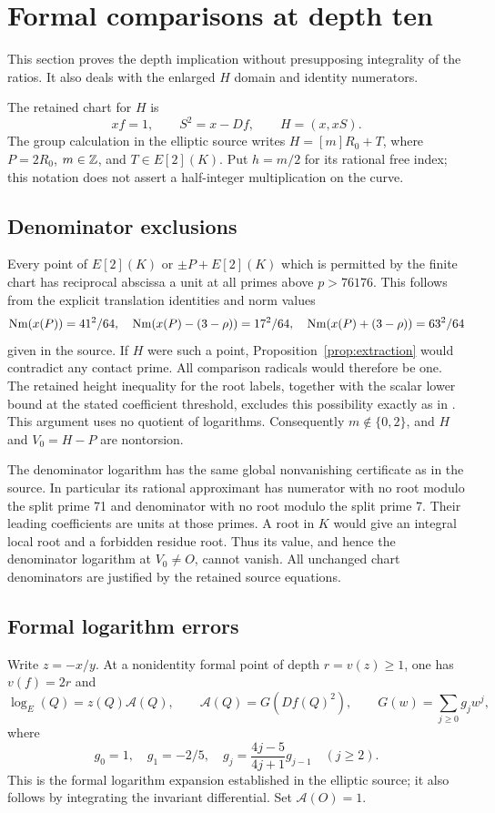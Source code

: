 \documentclass[11pt,a4paper]{article}
\theoremstyle{remark}\newtheorem{remark}[theorem]{Remark}
\begin{document}
\section{Formal comparisons at depth ten}\label{sec:formal}
This section proves the depth implication without presupposing
integrality of the ratios. It also deals with the enlarged $H$ domain
and identity numerators.

The retained chart for $H$ is
\[
 xf=1,\qquad S^2=x-Df,\qquad H=(x,xS).
\]
The group calculation in the elliptic source writes
$H=[m]R_0+T$, where $P=2R_0$, $m\in\mathbb Z$, and $T\in E[2](K)$.
Put $h=m/2$ for its rational free index; this notation does not
assert a half-integer multiplication on the curve.

\subsection{Denominator exclusions}
Every point of $E[2](K)$ or $\pm P+E[2](K)$ which is permitted by
the finite chart has reciprocal abscissa a unit at all primes above
$p>76176$. This follows from the explicit translation identities
and norm values
\[
 \operatorname{Nm}(x(P))=41^2/64,\quad
 \operatorname{Nm}(x(P)-(3-\rho))=17^2/64,\quad
 \operatorname{Nm}(x(P)+(3-\rho))=63^2/64
\]
given in the source. If $H$ were such a point,
Proposition~\ref{prop:extraction} would contradict any contact prime.
All comparison radicals would therefore be one. The retained height
inequality for the root labels, together with the scalar lower bound
at the stated coefficient threshold, excludes this possibility exactly
as in \cite{Existence,Explicit}. This argument uses no quotient of
logarithms. Consequently $m\notin\{0,2\}$, and $H$ and $V_0=H-P$
are nontorsion.

The denominator logarithm has the same global nonvanishing
certificate as in the source. In particular its rational approximant
has numerator with no root modulo the split prime 71 and denominator
with no root modulo the split prime 7. Their leading coefficients are
units at those primes. A root in $K$ would give an integral local root
and a forbidden residue root. Thus its value, and hence the denominator
logarithm at $V_0\ne O$, cannot vanish. All unchanged chart denominators
are justified by the retained source equations.

\subsection{Formal logarithm errors}
Write $z=-x/y$. At a nonidentity formal point of depth
$r=v(z)\ge1$, one has $v(f)=2r$ and
\[
 \log_E(Q)=z(Q)\mathcal A(Q),\qquad
 \mathcal A(Q)=G(Df(Q)^2),\qquad
 G(w)=\sum_{j\ge0}g_jw^j,
\]
where
\[
 g_0=1,\quad g_1=-2/5,\quad
 g_j=\frac{4j-5}{4j+1}g_{j-1}\quad(j\ge2).
\]
This is the formal logarithm expansion established in the elliptic
source; it also follows by integrating the invariant differential.
Set $\mathcal A(O)=1$.
\end{document}
